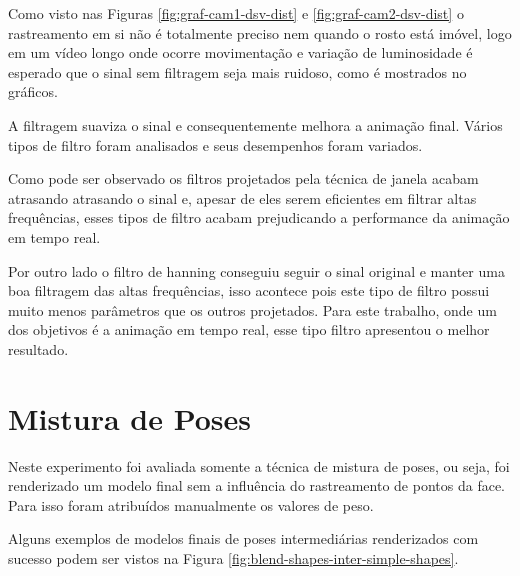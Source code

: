 Como visto nas Figuras \ref{fig:graf-cam1-dsv-dist} e \ref{fig:graf-cam2-dsv-dist} o rastreamento em si não é totalmente preciso nem quando o rosto está imóvel, logo em um vídeo longo onde ocorre movimentação e variação de luminosidade é esperado que o sinal sem filtragem seja mais ruidoso, como é mostrados no gráficos. 

A filtragem suaviza o sinal e consequentemente melhora a animação final. Vários tipos de filtro foram analisados e seus desempenhos foram variados.

Como pode ser observado os filtros projetados pela técnica de janela acabam atrasando atrasando o sinal e, apesar de eles serem eficientes em filtrar altas frequências, esses tipos de filtro acabam prejudicando a performance da animação em tempo real.

Por outro lado o filtro de hanning conseguiu seguir o sinal original e manter uma boa filtragem das altas frequências, isso acontece pois este tipo de filtro possui muito menos parâmetros que os outros projetados. Para este trabalho, onde um dos objetivos é a animação em tempo real, esse tipo filtro apresentou o melhor resultado.

\section{Mistura de Poses}

Neste experimento foi avaliada somente a técnica de mistura de poses, ou seja, foi renderizado um modelo final sem a influência do rastreamento de pontos da face. Para isso foram atribuídos manualmente os valores de peso.

Alguns exemplos de modelos finais de poses intermediárias renderizados com sucesso podem ser vistos na Figura \ref{fig:blend-shapes-inter-simple-shapes}.

